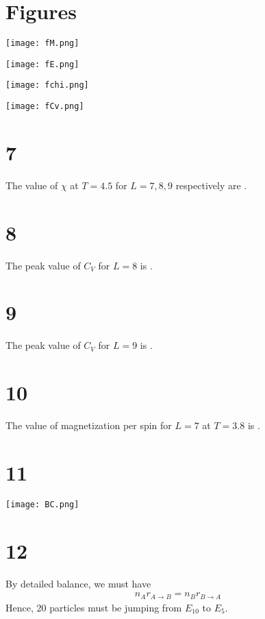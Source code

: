 \documentclass{article}
\begin{document}
\section*{Figures}

\begin{center}
    \texttt{[image: fM.png]}
\end{center}

\begin{center}
    \texttt{[image: fE.png]}
\end{center}

\begin{center}
    \texttt{[image: fchi.png]}
\end{center}

\begin{center}
    \texttt{[image: fCv.png]}
\end{center}

\section*{7}

The value of $\chi$ at $T=4.5$ for $L=7, 8, 9$ respectively are .

\section*{8}

The peak value of $C_V$ for $L = 8$ is .

\section*{9}

The peak value of $C_V$ for $L = 9$ is .

\section*{10}

The value of magnetization per spin for $L=7$ at $T=3.8$ is .

\section*{11}

\begin{center}
    \texttt{[image: BC.png]}
\end{center}

\section*{12}

By detailed balance, we must have
\begin{align*}
    n_A r_{A \to B} = n_B r_{B \to A}
\end{align*}
Hence, 20 particles must be jumping from $E_10$ to $E_5$.
\end{document}
